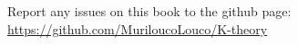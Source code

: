 \pagebreak
\hspace{0pt}
\vfill

\begin{center}
Report any issues on this book to the github page: \\
\href{https://github.com/MuriloucoLouco/K-theory}{https://github.com/MuriloucoLouco/K-theory}
\end{center}

\vfill
\hspace{0pt}
\pagebreak

